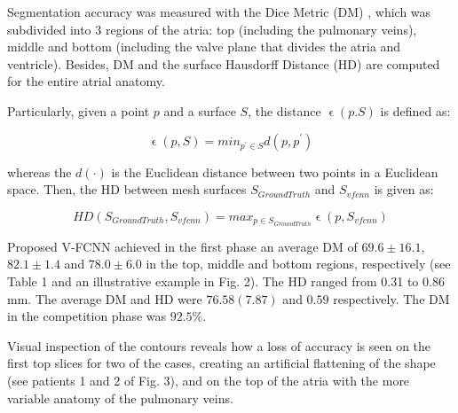 \documentclass{llncs}
\begin{document}
Segmentation accuracy was measured with the Dice Metric (DM) \cite{Avendi}, which was subdivided into 3 regions of the atria: top (including the pulmonary veins), middle and bottom (including the valve plane that divides the atria and ventricle). Besides, DM and the surface Hausdorff Distance (HD) \cite{Cignoni} are computed for the entire atrial anatomy.

Particularly, given a point $p$ and a surface $S$, the distance $\upvarepsilon(p.S)$ is defined as: 

\begin{equation}
\upvarepsilon(p,S)= min_{p^{'} \in S} d(p,p^{'})
\end{equation}

whereas the $d(\cdot)$ is the Euclidean distance between two points in a Euclidean space.
Then, the HD between mesh surfaces $S_{GroundTruth}$ and $S_{vfcnn}$ is given as: 

\begin{equation}
HD(S_{GroundTruth},S_{vfcnn}) = max_{p \in S_{GroundTruth}} \upvarepsilon(p,S_{vfcnn})
\end{equation}


Proposed V-FCNN achieved in the first phase an average DM of $69.6 \pm 16.1$, $82.1 \pm 1.4$ and $78.0 \pm 6.0$ in the top, middle and bottom regions, respectively (see Table 1 and an illustrative example in Fig. 2). The HD ranged from 0.31 to 0.86 mm. The average DM and HD were $76.58(7.87)$ and $0.59$ respectively. The DM in the competition phase was $92.5\%$.

Visual inspection of the contours reveals how a loss of accuracy is seen on the first top slices for two of the cases, creating an artificial flattening of the shape (see patients 1 and 2 of Fig. 3), and on the top of the atria with the more variable anatomy of the pulmonary veins. 
\end{document}
